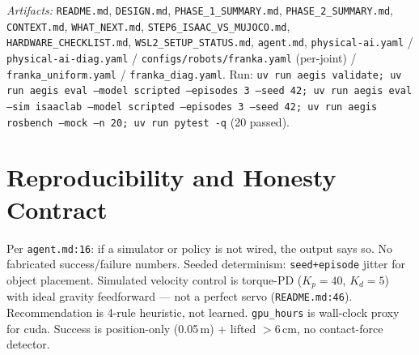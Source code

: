 \documentclass[11pt,a4paper]{article}
\begin{document}
\begin{center}
\footnotesize\textcolor{aegisgray}{\textit{Artifacts:} \texttt{README.md}, \texttt{DESIGN.md}, \texttt{PHASE\_1\_SUMMARY.md}, \texttt{PHASE\_2\_SUMMARY.md}, \texttt{CONTEXT.md}, \texttt{WHAT\_NEXT.md}, \texttt{STEP6\_ISAAC\_VS\_MUJOCO.md}, \texttt{HARDWARE\_CHECKLIST.md}, \texttt{WSL2\_SETUP\_STATUS.md}, \texttt{agent.md}, \texttt{physical-ai.yaml} / \texttt{physical-ai-diag.yaml} / \texttt{configs/robots/franka.yaml} (per-joint) / \texttt{franka\_uniform.yaml} / \texttt{franka\_diag.yaml}. Run: \texttt{uv run aegis validate; uv run aegis eval --model scripted --episodes 3 --seed 42; uv run aegis eval --sim isaaclab --model scripted --episodes 3 --seed 42; uv run aegis rosbench --mock --n 20; uv run pytest -q} (20 passed).}
\end{center}

\appendix
\section{Reproducibility and Honesty Contract}
Per \texttt{agent.md:16}: if a simulator or policy is not wired, the output says so. No fabricated success/failure numbers. Seeded determinism: \texttt{seed+episode} jitter for object placement. Simulated velocity control is torque-PD ($K_p=40$, $K_d=5$) with ideal gravity feedforward — not a perfect servo (\texttt{README.md:46}). Recommendation is 4-rule heuristic, not learned. \texttt{gpu\_hours} is wall-clock proxy for cuda. Success is position-only (0.05\,m) + lifted $>$6\,cm, no contact-force detector.
\end{document}
